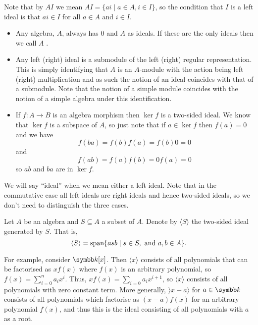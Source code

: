 Note that by \(AI\) we mean \(AI = \{a i \mid a \in A, i \in I\}\), so the condition that \(I\) is a left ideal is that \(ai \in I\) for all \(a \in A\) and \(i \in I\).

\begin{exm}{}{}
    \begin{itemize}
        \item Any algebra, \(A\), always has \(0\) and \(A\) as ideals.
        If these are the only ideals then we call \(A\) .
        \item Any left (right) ideal is a submodule of the left (right) regular representation.
        This is simply identifying that \(A\) is an \(A\)-module with the action being left (right) multiplication and as such the notion of an ideal coincides with that of a submodule.
        Note that the notion of a simple module coincides with the notion of a simple algebra under this identification.
        \item If \(f \colon A \to B\) is an algebra morphism then \(\ker f\) is a two-sided ideal.
        We know that \(\ker f\) is a subspace of \(A\), so just note that if \(a \in \ker f\) then \(f(a) = 0\) and we have
        \begin{equation}
            f(ba) = f(b)f(a) = f(b)0 = 0
        \end{equation}
        and
        \begin{equation}
            f(ab) = f(a)f(b) = 0f(a) = 0
        \end{equation}
        so \(ab\) and \(ba\) are in \(\ker f\).
    \end{itemize}
\end{exm}

We will say \enquote{ideal} when we mean either a left ideal.
Note that in the commutative case all left ideals are right ideals and hence two-sided ideals, so we don't need to distinguish the three cases.

\begin{ntn}{}{}
    Let \(A\) be an algebra and \(S \subseteq A\) a subset of \(A\).
    Denote by \(\langle S \rangle\) the two-sided ideal generated by \(S\).
    That is,
    \begin{equation}
        \langle S \rangle = \operatorname{span}\{asb \mid s \in S, \text{ and } a, b \in A\}.
    \end{equation}
\end{ntn}

For example, consider \(\field[x]\).
Then \(\langle x \rangle\) consists of all polynomials that can be factorised as \(xf(x)\) where \(f(x)\) is an arbitrary polynomial, so \(f(x) = \sum_{i=0}^n a_i x^i\).
Thus, \(x f(x) = \sum_{i=0} a_i x^{i + 1}\), so \(\langle x \rangle\) consists of all polynomials with zero constant term.
More generally, \(\rangle x - a \rangle\) for \(a \in \field\) consists of all polynomials which factorise as \((x - a)f(x)\) for an arbitrary polynomial \(f(x)\), and thus this is the ideal consisting of all polynomials with \(a\) as a root.

